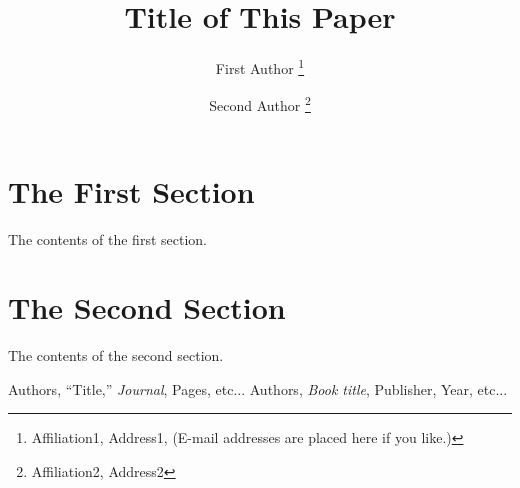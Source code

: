 \documentclass[a4paper]{article}
\begin{document}
\title{
  Title of This Paper     %
}
\author{
  First Author           %
  \thanks{
    Affiliation1, Address1,   %
    (E-mail addresses are placed here if you like.)
  }
  \and
  Second Author          %
  \thanks{ %
    Affiliation2, Address2  %
  }
}

\maketitle

\section{The First Section}

The contents of the first section.

\section{The Second Section}

The contents of the second section.

\begin{thebibliography}{9}
Authors, ``Title,'' {\em Journal}, Pages, etc...
Authors, {\em Book title}, Publisher, Year, etc...
\end{thebibliography}
\end{document}
